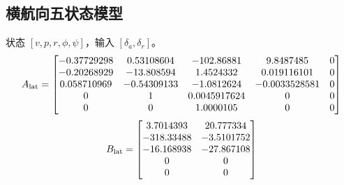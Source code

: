 \documentclass[UTF8,a4paper,11pt,fontset=windows]{ctexart}
\begin{document}
\subsection{横航向五状态模型}
状态 $[v,p,r,\phi,\psi]$，输入 $[\delta_a,\delta_r]$。
\begin{equation}\resizebox{0.95\linewidth}{!}{$A_{\rm lat}=\begin{bmatrix}
-0.37729298 & 0.53108604 & -102.86881 & 9.8487485 & 0 \\
-0.20268929 & -13.808594 & 1.4524332 & 0.019116101 & 0 \\
0.058710969 & -0.54309133 & -1.0812624 & -0.0033528581 & 0 \\
0 & 1 & 0.0045917624 & 0 & 0 \\
0 & 0 & 1.0000105 & 0 & 0 \\
\end{bmatrix}$}\end{equation}
\begin{equation}B_{\rm lat}=\begin{bmatrix}
3.7014393 & 20.777334 \\
-318.33488 & -3.5101752 \\
-16.168938 & -27.867108 \\
0 & 0 \\
0 & 0 \\
\end{bmatrix}\end{equation}

\clearpage
\end{document}
